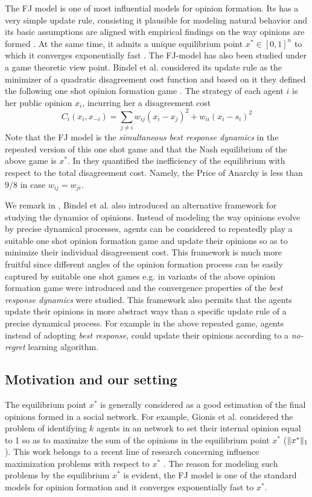The FJ model is one of most influential models for opinion formation.
Its has a very simple update rule, consisting it plausible
for modeling natural behavior and
its basic assumptions are aligned with empirical
findings on the way opinions are formed \cite{AFH05,K47}.
At the same time, it admits a unique equilibrium point
$x^* \in [0,1]^n$ to which it converges exponentially fast \cite{GS14}.
The FJ-model has also been studied under a game theoretic
view point. Bindel et al. considered its update rule
as the minimizer of a quadratic disagreement cost function
and based on it they defined the following one shot
opinion formation game \cite{BKO11}. The strategy of each agent $i$ is
her public opinion $x_i$, incurring her a
disagreement cost
%
\begin{equation}\label{eq:BKO_cost}
  C_i(x_i,x_{-i})=
  \sum_{j \neq i}w_{ij} (x_i-x_j)^2 + w_{ii}(x_i-s_i)^2
\end{equation}
%
Note that the FJ model is the \emph{simultaneous best response dynamics}
in the repeated version of this one shot game and that the Nash equilibrium
of the above game is $x^*$. In \cite{BKO11} they quantified 
the inefficiency of the equilibrium with respect to the total 
disagreement cost. Namely, the Price of Anarchy is less than $9/8$ 
in case $w_{ij}=w_{ji}$. 

We remark in \cite{BKO11}, Bindel et al. also introduced an alternative
framework for studying the dynamics of opinions.
Instead of modeling the way opinions evolve
by precise dynamical processes, agents can be considered to repeatedly
play a suitable one shot opinion formation game and update their
opinions so as to minimize their individual disagreement cost.
This framework is much more fruitful since
different angles of the opinion formation process can be easily
captured by suitable one shot games e.g. in \cite{BGM13,EFHS17}
variants of the above opinion formation game were introduced
and the convergence properties of the \emph{best response dynamics}
were studied. This framework also permits that the agents
update their opinions in more abstract ways than
a specific update rule of a precise dynamical process.
For example in the above repeated game, agents instead of
adopting \emph{best response}, could update their opinions according
to a \emph{no-regret} learning algorithm.

\subsection{Motivation and our setting}
The equilibrium point $x^*$ is generally considered
as a good estimation of the final opinions 
formed in a social network. For example, Gionis et al. \cite{GTT13} 
considered the problem of identifying $k$ agents in an network to set their
internal opinion equal to 1 so as to maximize the sum of the opinions 
in the equilibrium point $x^*$ ($\norm{1}{x^*}$). This work belongs to
a recent line of research concerning influence maximization problems 
with respect to $x^*$ \cite{GTT13,AKPT18,MMT17}. The reason for modeling
such problems by the equilibrium $x^*$ is evident, 
the FJ model is one of the standard models for opinion formation 
and it converges exponentially fast to $x^*$. 

